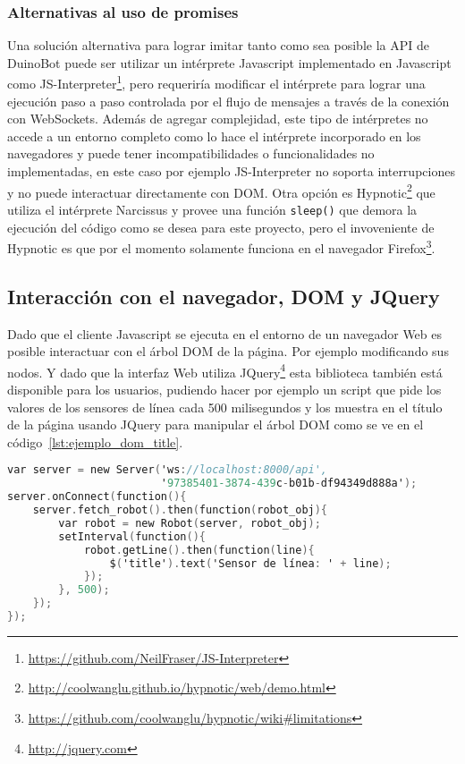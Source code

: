 \subsubsection{Alternativas al uso de promises}

Una solución alternativa para lograr imitar tanto como sea posible la
API de DuinoBot puede ser utilizar un intérprete Javascript implementado en
Javascript como
JS-Interpreter\footnote{\url{https://github.com/NeilFraser/JS-Interpreter}},
pero requeriría modificar el intérprete para lograr una ejecución paso a paso
controlada por el flujo de mensajes a través de la conexión con WebSockets.
Además de agregar complejidad, este tipo de intérpretes no accede a un entorno
completo como lo hace el intérprete incorporado en los navegadores y puede
tener incompatibilidades o funcionalidades no implementadas, en este caso
por ejemplo JS-Interpreter no soporta interrupciones y no puede interactuar
directamente con DOM. Otra opción es
Hypnotic\footnote{\url{http://coolwanglu.github.io/hypnotic/web/demo.html}}
que utiliza el intérprete Narcissus y provee una función \texttt{sleep()} que
demora la ejecución del código como se desea para este proyecto, pero el
invoveniente de Hypnotic es que por el momento solamente funciona en el
navegador
Firefox\footnote{\url{https://github.com/coolwanglu/hypnotic/wiki\#limitations}}.


\subsection{Interacción con el navegador, DOM y JQuery}

Dado que el cliente Javascript se ejecuta en el entorno de un navegador Web es posible
interactuar con el árbol DOM de la página. Por ejemplo modificando sus nodos.
Y dado que la interfaz Web utiliza
JQuery\footnote{\url{http://jquery.com}}
esta biblioteca también está disponible
para los usuarios, pudiendo hacer por ejemplo un script que pide los valores
de los sensores de línea cada 500 milisegundos y los muestra en el título de la
página usando JQuery para manipular el árbol DOM como se ve en el
 código~\ref{lst:ejemplo_dom_title}.

\begin{lstlisting}[language=C,
caption={Manipulación de DOM con JQuery desde
XRemoteBot para Javascript},
label={lst:ejemplo_dom_title}]
var server = new Server('ws://localhost:8000/api',
                        '97385401-3874-439c-b01b-df94349d888a');
server.onConnect(function(){
    server.fetch_robot().then(function(robot_obj){
        var robot = new Robot(server, robot_obj);
        setInterval(function(){
            robot.getLine().then(function(line){
                $('title').text('Sensor de línea: ' + line);
            });
        }, 500);
    });
});
\end{lstlisting}


